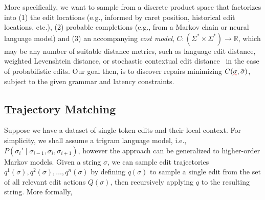 \documentclass[sigplan,review,anonymous,acmsmall]{acmart}\settopmatter{printfolios=false,printccs=false,printacmref=false}
\begin{document}
%
%

  More specifically, we want to sample from a discrete product space that factorizes into (1) the edit locations (e.g., informed by caret position, historical edit locations, etc.), (2) probable completions (e.g., from a Markov chain or neural language model) and (3) an accompanying \textit{cost model}, $C: (\Sigma^* \times \Sigma^*) \rightarrow \mathbb{R}$, which may be any number of suitable distance metrics, such as language edit distance, weighted Levenshtein distance, or stochastic contextual edit distance~\cite{cotterell+al.acl14} in the case of probabilistic edits. Our goal then, is to discover repairs minimizing $C(\err{\sigma}, \tilde{\sigma})$, subject to the given grammar and latency constraints.

  \subsection{Trajectory Matching}

  Suppose we have a dataset of single token edits and their local context. For simplicity, we shall assume a trigram language model, i.e., $P(\sigma_i' \mid \sigma_{i-1}, \sigma_i, \sigma_{i+1})$, however the approach can be generalized to higher-order Markov models. Given a string $\sigma$, we can sample edit trajectories $q^1(\sigma), q^2(\sigma), \ldots, q^n(\sigma)$ by defining $q(\sigma)$ to sample a single edit from the set of all relevant edit actions $Q(\sigma)$, then recursively applying $q$ to the resulting string. More formally,
\end{document}
